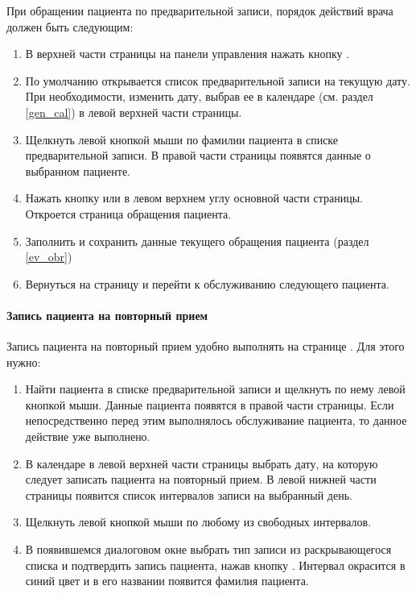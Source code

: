 {При обращении пациента по предварительной записи, порядок действий врача должен быть следующим:
\begin{enumerate}
	\item В верхней части страницы на панели управления нажать кнопку .
	\item По умолчанию открывается список предварительной записи на текущую дату. При необходимости, изменить дату, выбрав ее в календаре (см. раздел \ref{gen_cal}) в левой верхней части страницы.
	\item Щелкнуть левой кнопкой мыши по фамилии пациента в списке предварительной записи. В правой части страницы появятся данные о выбранном пациенте.
	\item Нажать кнопку  или  в левом верхнем углу основной части страницы. Откроется страница обращения пациента.
	\item Заполнить и сохранить данные текущего обращения пациента (раздел \ref{ev_obr})
	\item Вернуться на страницу  и перейти к обслуживанию следующего пациента.
\end{enumerate}

\paragraph{Запись пациента на повторный прием} 

Запись пациента на повторный прием удобно выполнять на странице . Для этого нужно:
\begin{enumerate}
	\item Найти пациента в списке предварительной записи и щелкнуть по нему левой кнопкой мыши. Данные пациента появятся в правой части страницы. Если непосредственно перед этим выполнялось обслуживание пациента, то данное действие уже выполнено.
	\item В календаре в левой верхней части страницы выбрать дату, на которую следует записать пациента на повторный прием. В левой нижней части страницы появится список интервалов записи на выбранный день.
	\item Щелкнуть левой кнопкой мыши по любому из свободных интервалов.
	\item В появившемся диалоговом окне выбрать тип записи из раскрывающегося списка и подтвердить запись пациента, нажав кнопку . Интервал окрасится в синий цвет и в его названии появится фамилия пациента.
\end{enumerate} 

}

